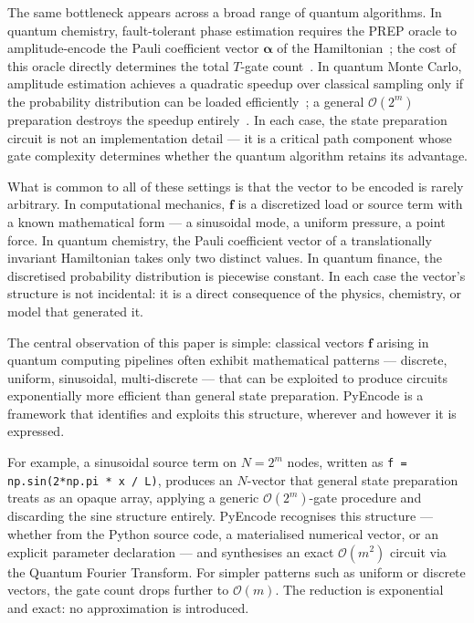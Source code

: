 \documentclass[10pt,twocolumn]{article}
\newcommand{\bigO}[1]{\mathcal{O}(#1)}
\begin{document}
The same bottleneck appears across a broad range of quantum
algorithms. In quantum chemistry, fault-tolerant phase estimation
requires the PREP oracle to amplitude-encode the Pauli coefficient
vector $\boldsymbol{\alpha}$ of the Hamiltonian~\cite{childs2018};
the cost of this oracle directly determines the total $T$-gate
count~\cite{babbush2018}. In quantum Monte Carlo, amplitude
estimation achieves a quadratic speedup over classical sampling
only if the probability distribution can be loaded
efficiently~\cite{montanaro2015}; a general $\bigO{2^m}$
preparation destroys the speedup entirely~\cite{Herbert2022}.
In each case, the state preparation circuit is not an
implementation detail --- it is a critical path component whose
gate complexity determines whether the quantum algorithm
retains its advantage.

What is common to all of these settings is that the vector
to be encoded is rarely arbitrary. In computational mechanics,
$\mathbf{f}$ is a discretized load or source term with a
known mathematical form --- a sinusoidal mode, a uniform
pressure, a point force. In quantum chemistry, the Pauli
coefficient vector of a translationally invariant Hamiltonian
takes only two distinct values. In quantum finance, the
discretised probability distribution is piecewise constant.
In each case the vector's structure is not incidental: it is
a direct consequence of the physics, chemistry, or model
that generated it.

\begin{mdframed}[backgroundcolor=highlightblue,
                 linecolor=codeblue, linewidth=0.8pt,
                 innertopmargin=4pt, innerbottommargin=4pt,
                 innerleftmargin=6pt, innerrightmargin=6pt]
\small
The central observation of this paper is simple: classical
vectors $\mathbf{f}$ arising in quantum computing pipelines
often exhibit mathematical patterns --- discrete, uniform,
sinusoidal, multi-discrete --- that can be exploited to produce
circuits exponentially more efficient than general state
preparation. PyEncode is a framework that identifies and
exploits this structure, wherever and however it is expressed.
\end{mdframed}
\vspace{4pt}

For example, a sinusoidal source term on $N = 2^m$ nodes,
written as \texttt{f = np.sin(2*np.pi * x / L)}, produces
an $N$-vector that general state preparation treats as an
opaque array, applying a generic $\bigO{2^m}$-gate procedure
and discarding the sine structure entirely. PyEncode
recognises this structure --- whether from the Python source
code, a materialised numerical vector, or an explicit
parameter declaration --- and synthesises an exact
$\bigO{m^2}$ circuit via the Quantum Fourier Transform.
For simpler patterns such as uniform or discrete vectors,
the gate count drops further to $\bigO{m}$. The reduction
is exponential and exact: no approximation is introduced.
\end{document}
